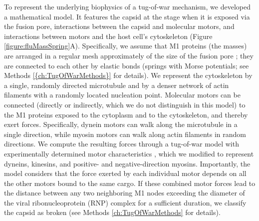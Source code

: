 To represent the underlying biophysics of a tug-of-war mechanism, we developed a mathematical model. It features the capsid at the stage when it is exposed via the fusion pore, interactions between the capsid and molecular motors, and interactions between motors and the host cell’s cytoskeleton (Figure \ref{figure:fluMassSpring}A). Specifically, we assume that M1 proteins (the masses) are arranged in a regular mesh approximately of the size of the fusion pore \cite{hilsch2014influenza}; they are connected to each other by elastic bonds (springs with Morse potentials; see Methods \ref{{ch:TugOfWarMethods}} for details). We represent the cytoskeleton by a single, randomly directed microtubule and by a denser network of actin filaments with a randomly located nucleation point. Molecular motors can be connected (directly or indirectly, which we do not distinguish in this model) to the M1 proteins exposed to the cytoplasm and to the cytoskeleton, and thereby exert forces. Specifically, dynein motors can walk along the microtubule in a single direction, while myosin motors can walk along actin filaments in random directions. We compute the resulting forces through a tug-of-war model with experimentally determined motor characteristics \cite{gennerich2007force, muller2008tug, norstrom2010unconventional}, which we modified to represent dyneins, kinesins, and positive- and negative-direction myosins. Importantly, the model considers that the force exerted by each individual motor depends on all the other motors bound to the same cargo. If these combined motor forces lead to the distance between any two neighboring M1 nodes exceeding the diameter of the viral ribonucleoprotein (RNP) complex for a sufficient duration, we classify the capsid as broken (see Methods \ref{ch:TugOfWarMethods} for details).

